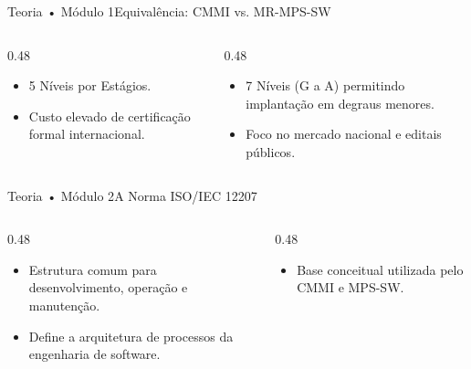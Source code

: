 \begin{senaiframe}{Teoria • Módulo 1}{Equivalência: CMMI vs. MR-MPS-SW}
  \begin{columns}[t]
    \begin{column}{0.48\textwidth}
      \begin{tcolorbox}[senaibluecard, title={CMMI}]
        \begin{itemize}
          \item 5 Níveis por Estágios.
          \item Custo elevado de certificação formal internacional.
        \end{itemize}
      \end{tcolorbox}
    \end{column}
    \begin{column}{0.48\textwidth}
      \begin{tcolorbox}[senaigreencard, title={MPS-SW}]
        \begin{itemize}
          \item 7 Níveis (G a A) permitindo implantação em degraus menores.
          \item Foco no mercado nacional e editais públicos.
        \end{itemize}
      \end{tcolorbox}
    \end{column}
  \end{columns}
\end{senaiframe}

\begin{senaiframe}{Teoria • Módulo 2}{A Norma ISO/IEC 12207}
  \begin{columns}[t]
    \begin{column}{0.48\textwidth}
      \begin{tcolorbox}[senaibluecard, title={Ciclo de Vida de Software}]
        \begin{itemize}
          \item Estrutura comum para desenvolvimento, operação e manutenção.
          \item Define a arquitetura de processos da engenharia de software.
        \end{itemize}
      \end{tcolorbox}
    \end{column}
    \begin{column}{0.48\textwidth}
      \begin{tcolorbox}[senaicard, title={Padronização}]
        \begin{itemize}
          \item Base conceitual utilizada pelo CMMI e MPS-SW.
        \end{itemize}
      \end{tcolorbox}
    \end{column}
  \end{columns}
\end{senaiframe}


